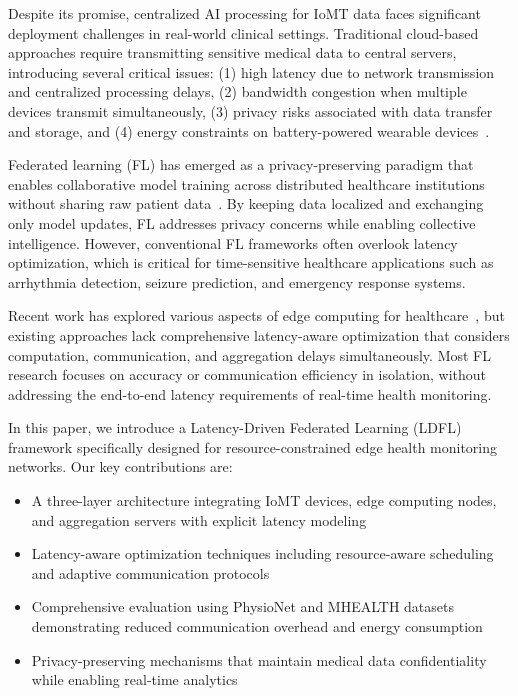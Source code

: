 \documentclass[10pt,conference]{IEEEtran}
\begin{document}
Despite its promise, centralized AI processing for IoMT data faces significant deployment challenges in real-world clinical settings. Traditional cloud-based approaches require transmitting sensitive medical data to central servers, introducing several critical issues: (1) high latency due to network transmission and centralized processing delays, (2) bandwidth congestion when multiple devices transmit simultaneously, (3) privacy risks associated with data transfer and storage, and (4) energy constraints on battery-powered wearable devices~\cite{kairouz2021advances}.

Federated learning (FL) has emerged as a privacy-preserving paradigm that enables collaborative model training across distributed healthcare institutions without sharing raw patient data~\cite{mcmahan2017communication}. By keeping data localized and exchanging only model updates, FL addresses privacy concerns while enabling collective intelligence. However, conventional FL frameworks often overlook latency optimization, which is critical for time-sensitive healthcare applications such as arrhythmia detection, seizure prediction, and emergency response systems.

Recent work has explored various aspects of edge computing for healthcare~\cite{li2020federated}, but existing approaches lack comprehensive latency-aware optimization that considers computation, communication, and aggregation delays simultaneously. Most FL research focuses on accuracy or communication efficiency in isolation, without addressing the end-to-end latency requirements of real-time health monitoring.

In this paper, we introduce a Latency-Driven Federated Learning (LDFL) framework specifically designed for resource-constrained edge health monitoring networks. Our key contributions are:

\begin{itemize}
    \item A three-layer architecture integrating IoMT devices, edge computing nodes, and aggregation servers with explicit latency modeling
    \item Latency-aware optimization techniques including resource-aware scheduling and adaptive communication protocols
    \item Comprehensive evaluation using PhysioNet and MHEALTH datasets demonstrating reduced communication overhead and energy consumption
    \item Privacy-preserving mechanisms that maintain medical data confidentiality while enabling real-time analytics
\end{itemize}
\end{document}
